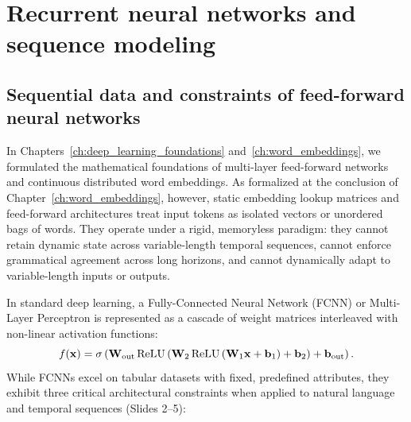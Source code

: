 \documentclass[../../main.tex]{subfiles}
\begin{document}
\chapter{Recurrent neural networks and sequence modeling}
\label{ch:rnn_sequence_modeling}

\section{Sequential data and constraints of feed-forward neural networks}
\label{sec:fcnn_limits}

In Chapters~\ref{ch:deep_learning_foundations} and~\ref{ch:word_embeddings}, we formulated the mathematical foundations of multi-layer feed-forward networks and continuous distributed word embeddings. As formalized at the conclusion of Chapter~\ref{ch:word_embeddings}, however, static embedding lookup matrices and feed-forward architectures treat input tokens as isolated vectors or unordered bags of words. They operate under a rigid, memoryless paradigm: they cannot retain dynamic state across variable-length temporal sequences, cannot enforce grammatical agreement across long horizons, and cannot dynamically adapt to variable-length inputs or outputs.

In standard deep learning, a Fully-Connected Neural Network (FCNN) or Multi-Layer Perceptron is represented as a cascade of weight matrices interleaved with non-linear activation functions:
\begin{equation}
\label{eq:fcnn_cascade}
f(\mathbf{x}) = \sigma\left( \mathbf{W}_{\text{out}} \operatorname{\mathrm{ReLU}}\left( \mathbf{W}_2 \operatorname{\mathrm{ReLU}}\left( \mathbf{W}_1 \mathbf{x} + \mathbf{b}_1 \right) + \mathbf{b}_2 \right) + \mathbf{b}_{\text{out}} \right).
\end{equation}
While FCNNs excel on tabular datasets with fixed, predefined attributes, they exhibit three critical architectural constraints when applied to natural language and temporal sequences (Slides 2--5):
\end{document}
